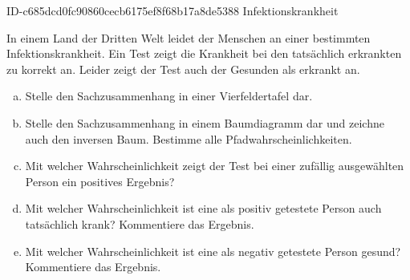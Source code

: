 \begin{exercise}
      {ID-c685dcd0fc90860cecb6175ef8f68b17a8de5388}
      {Infektionskrankheit}
  \ifproblem\problem\par
    In einem Land der Dritten Welt leidet  der Menschen an einer
    bestimmten Infektionskrankheit. Ein Test zeigt die Krankheit bei den
    tatsächlich erkrankten zu  korrekt an. Leider zeigt der Test
    auch  der Gesunden als erkrankt an.
    \begin{enumerate}[a)]
      \item Stelle den Sachzusammenhang in einer Vierfeldertafel dar.
      \item Stelle den Sachzusammenhang in einem Baumdiagramm dar und zeichne
            auch den inversen Baum. Bestimme alle Pfadwahrscheinlichkeiten.
      \item Mit welcher Wahrscheinlichkeit zeigt der Test bei einer zufällig
            ausgewählten Person ein positives Ergebnis?
      \item Mit welcher Wahrscheinlichkeit ist eine als positiv getestete
            Person auch tatsächlich krank? Kommentiere das Ergebnis.
      \item Mit welcher Wahrscheinlichkeit ist eine als negativ getestete
            Person gesund? Kommentiere das Ergebnis.
    \end{enumerate}
  \fi
\end{exercise}

